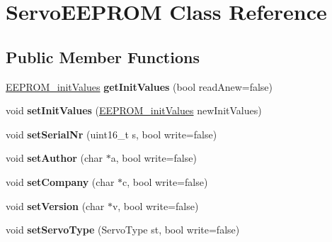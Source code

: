 \hypertarget{class_servo_e_e_p_r_o_m}{}\section{Servo\+E\+E\+P\+R\+OM Class Reference}
\label{class_servo_e_e_p_r_o_m}
\subsection*{Public Member Functions}
\begin{DoxyCompactItemize}
\item 
\mbox{\label{class_servo_e_e_p_r_o_m_abc383ca4a1ab14e661360d716a59b20b}} 
\hyperlink{struct_e_e_p_r_o_m__init_values}{E\+E\+P\+R\+O\+M\+\_\+init\+Values} {\bfseries get\+Init\+Values} (bool read\+Anew=false)
\item 
\mbox{\label{class_servo_e_e_p_r_o_m_a0051b754f421b6bf445382e451e49c46}} 
void {\bfseries set\+Init\+Values} (\hyperlink{struct_e_e_p_r_o_m__init_values}{E\+E\+P\+R\+O\+M\+\_\+init\+Values} new\+Init\+Values)
\item 
\mbox{\label{class_servo_e_e_p_r_o_m_a95e15688bd53fec84abbff468f6ea0ef}} 
void {\bfseries set\+Serial\+Nr} (uint16\+\_\+t s, bool write=false)
\item 
\mbox{\label{class_servo_e_e_p_r_o_m_a16f2355d737e42f37e6c4e09e07726cc}} 
void {\bfseries set\+Author} (char $\ast$a, bool write=false)
\item 
\mbox{\label{class_servo_e_e_p_r_o_m_acf5e1dd4d94ec23721382bbb2070016b}} 
void {\bfseries set\+Company} (char $\ast$c, bool write=false)
\item 
\mbox{\label{class_servo_e_e_p_r_o_m_a823ca74dfa75dea8389d56c77492c4cf}} 
void {\bfseries set\+Version} (char $\ast$v, bool write=false)
\item 
\mbox{\label{class_servo_e_e_p_r_o_m_ae17b064bad05b5ac7587b9a40ea5696c}} 
void {\bfseries set\+Servo\+Type} (Servo\+Type st, bool write=false)
\item 
\mbox{\label{class_servo_e_e_p_r_o_m_aa19b1da84b03381e30b9019a5493aaf8}} 

\end{DoxyCompactItemize}
